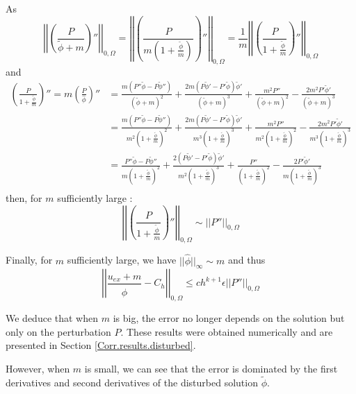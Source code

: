 As 
\begin{equation*}
	\left|\left|\left(\frac{P}{\tilde{\phi}+m}\right)''\right|\right|_{0,\Omega}=\left|\left|\left(\frac{P}{m\left(1+\frac{\tilde{\phi}}{m}\right)}\right)''\right|\right|_{0,\Omega}=\frac{1}{m}\left|\left|\left(\frac{P}{1+\frac{\tilde{\phi}}{m}}\right)''\right|\right|_{0,\Omega}
\end{equation*}
and 
\begin{align*}
	\left(\frac{P}{1+\frac{\tilde{\phi}}{m}}\right)''=m\left(\frac{P}{\hat{\phi}}\right)''&=\frac{m(P''\tilde{\phi}-P\tilde{\phi}'')}{(\tilde{\phi}+m)^2}+\frac{2m(P\tilde{\phi}'-P'\tilde{\phi})\tilde{\phi}'}{(\tilde{\phi}+m)^3}+    \frac{m^2P''}{(\tilde{\phi}+m)^2}-\frac{2m^2P'\tilde{\phi}'}{(\tilde{\phi}+m)^3} \\
	&=\frac{m(P''\tilde{\phi}-P\tilde{\phi}'')}{m^2\left(1+\frac{\tilde{\phi}}{m}\right)^2}+\frac{2m(P\tilde{\phi}'-P'\tilde{\phi})\tilde{\phi}'}{m^3\left(1+\frac{\tilde{\phi}}{m}\right)^3}+    \frac{m^2P''}{m^2\left(1+\frac{\tilde{\phi}}{m}\right)^2}-\frac{2m^2P'\tilde{\phi}'}{m^3\left(1+\frac{\tilde{\phi}}{m}\right)^3} \\
	&=\frac{P''\tilde{\phi}-P\tilde{\phi}''}{m\left(1+\frac{\tilde{\phi}}{m}\right)^2}+\frac{2(P\tilde{\phi}'-P'\tilde{\phi})\tilde{\phi}'}{m^2\left(1+\frac{\tilde{\phi}}{m}\right)^3}+    \frac{P''}{\left(1+\frac{\tilde{\phi}}{m}\right)^2}-\frac{2P'\tilde{\phi}'}{m\left(1+\frac{\tilde{\phi}}{m}\right)^3} \\
\end{align*}
then, for $m$ sufficiently large :
\begin{equation*}
	\left|\left|\left(\frac{P}{1+\frac{\tilde{\phi}}{m}}\right)''\right|\right|_{0,\Omega}\sim\left|\left|P''\right|\right|_{0,\Omega}
\end{equation*}

Finally, for $m$ sufficiently large, we have $||\hat{\phi}||_\infty\sim m$ and thus
\begin{equation*}
	\left|\left|\frac{u_{ex}+m}{\hat{\phi}}-C_h\right|\right|_{0,\Omega}\le ch^{k+1}\epsilon\left|\left|P''\right|\right|_{0,\Omega}
\end{equation*}

We deduce that when $m$ is big, the error no longer depends on the solution but only on the perturbation $P$. These results were obtained numerically and are presented in Section \ref{Corr.results.disturbed}.

However, when $m$ is small, we can see that the error is dominated by the first derivatives and second derivatives of the disturbed solution $\tilde{\phi}$.

